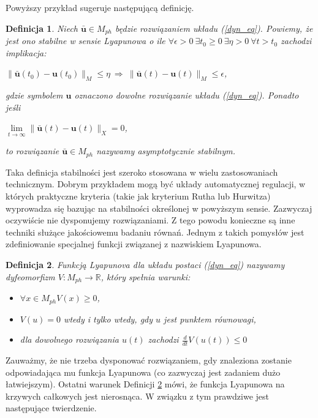 \documentclass[12pt]{article}
\newtheorem{defi}{Definicja}
\begin{document}
Powyższy przykład sugeruje następującą definicję.
\begin{defi}\label{stable_point}
	Niech $ \bar{\textbf{u}} \in M_{ph} $ będzie rozwiązaniem układu (\ref{dyn_eq}). Powiemy, że jest ono stabilne w sensie Lyapunowa o ile $\forall \epsilon>0 \  \exists t_{0} \geq 0 \  \exists \eta>0 \  \forall t>t_{0}$ zachodzi implikacja:\newline
\centerline {$ 	\|\bar{\textbf{u}}(t_{0}) - \textbf{u}(t_{0}) \|_{M}  \leq \eta \  \Rightarrow \ \|\bar{\textbf{u}}(t) - \textbf{u}(t) \|_{M}  \leq \epsilon$,}
gdzie symbolem $ \textbf{u} $ oznaczono dowolne rozwiązanie układu (\ref{dyn_eq}).\newline
Ponadto jeśli \newline
\centerline{$ \lim\limits_{t \rightarrow \infty}\|\bar{\textbf{u}}(t) - \textbf{u}(t) \|_{X} = 0$,}
to rozwiązanie $ \bar{\textbf{u}} \in M_{ph} $ nazywamy asymptotycznie stabilnym.
\end{defi}
Taka definicja stabilności jest szeroko stosowana w wielu zastosowaniach technicznym. Dobrym przykładem mogą być układy automatycznej regulacji, w których praktyczne kryteria (takie jak kryterium Rutha lub Hurwitza) wyprowadza się bazując na stabilności określonej w powyższym sensie.\newline
Zazwyczaj oczywiście nie dysponujemy rozwiązaniami. Z tego powodu konieczne są inne techniki służące jakościowemu badaniu równań. Jednym z takich pomysłów jest zdefiniowanie specjalnej funkcji związanej z nazwiskiem Lyapunowa.
\newline
\begin{defi}
	\label{Lyapnuv_function}
	Funkcją Lyapunova dla układu postaci (\ref{dyn_eq}) nazywamy dyfeomorfizm $ V: M_{ph} \rightarrow \mathbb{R} $, który spełnia warunki:
	\begin{itemize}
		\item $\forall x \in M_{ph} V(x) \geq 0$,
		\item $ V(u) = 0 $ wtedy i tylko wtedy, gdy $ u $ jest punktem równowagi,
		\item dla dowolnego rozwiązania $ u(t) $ zachodzi $ \frac{d}{dt}V(u(t)) \leq 0 $
	\end{itemize}
\end{defi}
Zauważmy, że nie trzeba dysponować rozwiązaniem, gdy znaleziona zostanie odpowiadająca mu funkcja Lyapunowa (co zazwyczaj jest zadaniem dużo łatwiejszym). Ostatni warunek  Definicji \ref{Lyapnuv_function} mówi, że funkcja Lyapunowa na krzywych całkowych jest nierosnąca. W związku z tym prawdziwe jest następujące twierdzenie.
\end{document}
